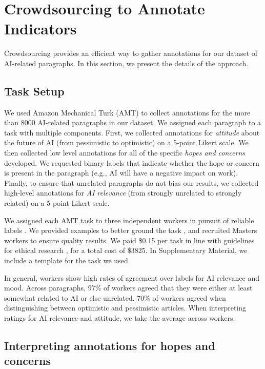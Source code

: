 \documentclass[letterpaper]{article}
\begin{document}
\section{Crowdsourcing to Annotate Indicators}

Crowdsourcing provides an efficient way to gather annotations for our dataset of AI-related paragraphs. In this section, we present the details of the approach.

\subsection{Task Setup}

We used Amazon Mechanical Turk (AMT) to collect annotations for the more than 8000 AI-related paragraphs in our dataset. We assigned each paragraph to a task with multiple components. First, we collected annotations for \textit{attitude} about the future of AI (from pessimistic to optimistic) on a 5-point Likert scale. We then collected low level annotations for all of the specific \textit{hopes and concerns} developed. We requested binary labels that indicate whether the hope or concern is present in the paragraph (e.g., AI will have a negative impact on work). 
Finally, to ensure that unrelated paragraphs do not bias our results, we collected high-level annotations for \textit{AI relevance} (from strongly unrelated to strongly related) on a 5-point Likert scale.

We assigned each AMT task to three independent workers in pursuit of reliable labels \cite{get-another-label}. We provided examples to better ground the task \cite{examples}, and recruited Masters workers to ensure quality results. We paid \$0.15 per task in line with guidelines for ethical research \cite{dynamo}, for a total cost of \$3825. In Supplementary Material, we include a template for the task we used.

In general, workers show high rates of agreement over labels for AI relevance and mood. Across paragraphs, 97\% of workers agreed that they were either at least somewhat related to AI or else unrelated. 70\% of workers agreed when distinguishing between optimistic and pessimistic articles. When interpreting ratings for AI relevance and attitude, we take the average across workers.

\subsection{Interpreting annotations for hopes and concerns}
\end{document}
